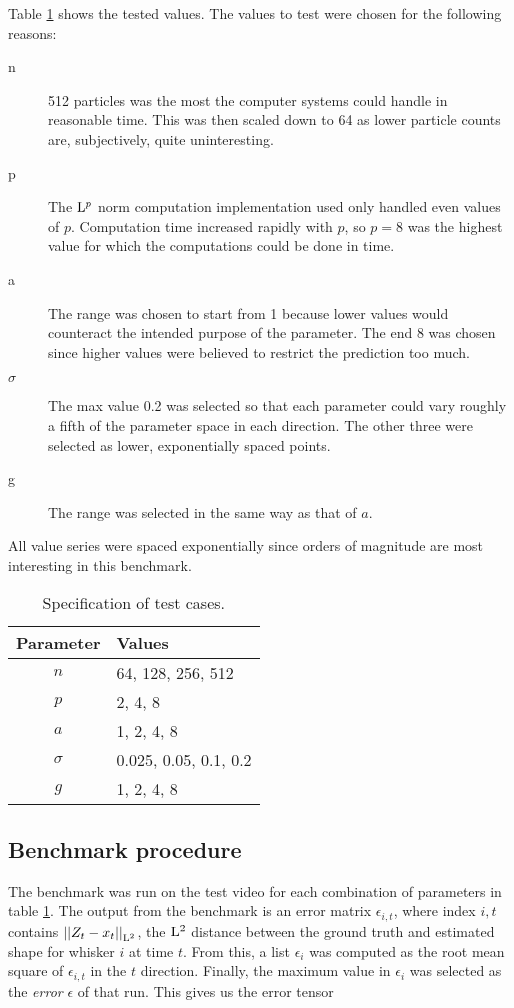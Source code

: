 Table \ref{tbl:testcases} shows the tested values. The values to test
were chosen for the following reasons:

\begin{description}
\item[n] 512 particles was the most the computer systems could handle
  in reasonable time. This was then scaled down to 64 as lower
  particle counts are, subjectively, quite uninteresting.
\item[p] The $\Lp$ norm computation implementation used only handled
  even values of $p$. Computation time increased rapidly with $p$, so
  $p=8$ was the highest value for which the computations could be done
  in time.
\item[a] The range was chosen to start from 1 because lower values
  would counteract the intended purpose of the parameter. The end 8
  was chosen since higher values were believed to restrict the
  prediction too much.
\item[$\sigma$] The max value 0.2 was selected so that each parameter
  could vary roughly a fifth of the parameter space in each
  direction. The other three were selected as lower, exponentially
  spaced points.
\item[g] The range was selected in the same way as that of $a$.
\end{description}

All value series were spaced exponentially since orders of magnitude
are most interesting in this benchmark.

\begin{table}
  \centering
  \begin{tabular}{c|l}
    Parameter & Values\\
    \hline
    $n$ & 64, 128, 256, 512\\
    $p$ & 2, 4, 8\\
    $a$ & 1, 2, 4, 8\\
    $\sigma$ & 0.025, 0.05, 0.1, 0.2\\
    $g$ & 1, 2, 4, 8
  \end{tabular}
  \caption{Specification of test cases.}
  \label{tbl:testcases}
\end{table}

\subsection{Benchmark procedure}

The benchmark was run on the test video for each combination of
parameters in table \ref{tbl:testcases}. The output from the benchmark
is an error matrix $\epsilon_{i,t}$, where index $i, t$ contains
$\Lpnorm[2]{Z_t - x_t}$, the $\Lp[2]$ distance between the ground
truth and estimated shape for whisker $i$ at time $t$. From this, a
list $\epsilon_i$ was computed as the root mean square of
$\epsilon_{i,t}$ in the $t$ direction. Finally, the maximum value in
$\epsilon_i$ was selected as the \emph{error} $\epsilon$ of that
run. This gives us the error tensor

